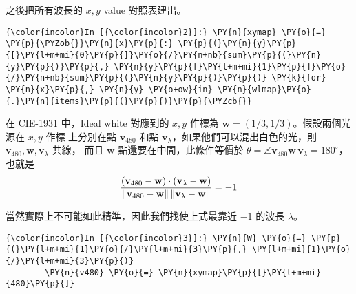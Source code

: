\documentclass[12pt, a4paper]{article}
\DeclarePairedDelimiter{\norm}{\lVert}{\rVert}
\begin{document}
\begin{enumerate}[label={\bf (\alph*)}, leftmargin=0pt]
    之後把所有波長的 $x, y$ value 對照表建出。
    \begin{Verbatim}[commandchars=\\\{\}]
{\color{incolor}In [{\color{incolor}2}]:} \PY{n}{xymap} \PY{o}{=} \PY{p}{\PYZob{}}\PY{n}{x}\PY{p}{:} \PY{p}{(}\PY{n}{y}\PY{p}{[}\PY{l+m+mi}{0}\PY{p}{]}\PY{o}{/}\PY{n+nb}{sum}\PY{p}{(}\PY{n}{y}\PY{p}{)}\PY{p}{,} \PY{n}{y}\PY{p}{[}\PY{l+m+mi}{1}\PY{p}{]}\PY{o}{/}\PY{n+nb}{sum}\PY{p}{(}\PY{n}{y}\PY{p}{)}\PY{p}{)} \PY{k}{for} \PY{n}{x}\PY{p}{,} \PY{n}{y} \PY{o+ow}{in} \PY{n}{wlmap}\PY{o}{.}\PY{n}{items}\PY{p}{(}\PY{p}{)}\PY{p}{\PYZcb{}}
\end{Verbatim}

\newcommand{\ww}{\mathbf{w}}
\newcommand{\vv}{\mathbf{v}}
  在 CIE-1931 中，Ideal white 對應到的 $x, y$ 作標為 $\ww = (1/3, 1/3)$。假設兩個光源在 $x, y$ 作標
  上分別在點 $\vv_{480}$ 和點 $\vv_{\lambda}$，如果他們可以混出白色的光，則 $\vv_{480}, \ww, \vv_\lambda$ 共線，
  而且 $\ww$ 點還要在中間，此條件等價於 $\theta = \measuredangle \vv_{480} \ww\, \vv_\lambda = 180^\circ$，也就是
  \[ \frac{(\vv_{480} - \ww) \cdot (\vv_\lambda - \ww)}{ \norm{\vv_{480} - \ww} \, \norm{\vv_\lambda - \ww} }= -1 \]

  當然實際上不可能如此精準，因此我們找使上式最靠近 $-1$ 的波長 $\lambda$。
    \begin{Verbatim}[commandchars=\\\{\}]
{\color{incolor}In [{\color{incolor}3}]:} \PY{n}{W} \PY{o}{=} \PY{p}{(}\PY{l+m+mi}{1}\PY{o}{/}\PY{l+m+mi}{3}\PY{p}{,} \PY{l+m+mi}{1}\PY{o}{/}\PY{l+m+mi}{3}\PY{p}{)}
        \PY{n}{v480} \PY{o}{=} \PY{n}{xymap}\PY{p}{[}\PY{l+m+mi}{480}\PY{p}{]}
\end{Verbatim}


\end{enumerate}
\end{document}
